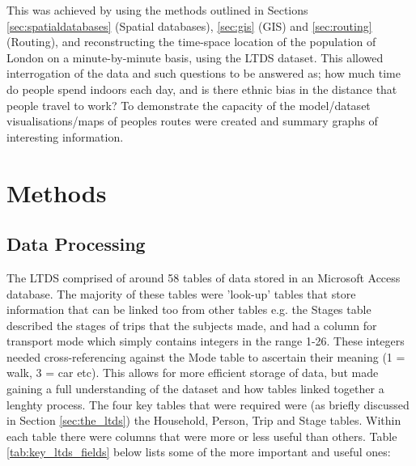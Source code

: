 This was achieved by using the methods outlined in Sections \ref{sec:spatialdatabases} (Spatial databases), \ref{sec:gis} (GIS) and \ref{sec:routing} (Routing), and reconstructing the time-space location of the population of London on a minute-by-minute basis, using the LTDS dataset. This allowed interrogation of the data and such questions to be answered as; how much time do people spend indoors each day, and is there ethnic bias in the distance that people travel to work? To demonstrate the capacity of the model/dataset visualisations/maps of peoples routes were created and summary graphs of interesting information.

\section{Methods}
\label{sec:1_methods}

\subsection{Data Processing}
\label{sec:reconstruction_data_processing}

The LTDS comprised of around 58 tables of data stored in an Microsoft Access database. The majority of these tables were 'look-up' tables that store information that can be linked too from other tables e.g. the Stages table described the stages of trips that the subjects made, and had a column for transport mode which simply contains integers in the range 1-26. These integers needed cross-referencing against the Mode table to ascertain their meaning (1 = walk, 3 = car etc). This allows for more efficient storage of data, but made gaining a full understanding of the dataset and how tables linked together a lenghty process. The four key tables that were required were (as briefly discussed in Section \ref{sec:the_ltds}) the Household, Person, Trip and Stage tables. Within each table there were columns that were more or less useful than others.  Table \ref{tab:key_ltds_fields} below lists some of the more important and useful ones:

\newpage

